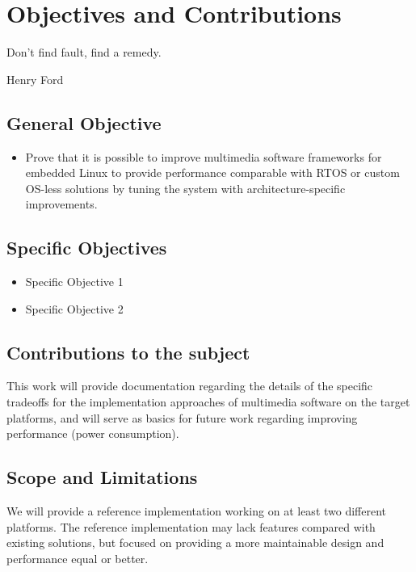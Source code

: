 \chapter{Objectives and Contributions}
\epigraph{Don't find fault, find a remedy.}{Henry Ford}

\section{General Objective}

\begin{itemize}
\item Prove that it is possible to improve multimedia software frameworks for embedded Linux to provide performance comparable with \ac{RTOS} or custom \ac{OS}-less solutions by tuning the system with architecture-specific improvements.
\end{itemize}

\section{Specific Objectives}
\begin{itemize}
\item Specific Objective 1
\item Specific Objective 2
\end{itemize}

\section{Contributions to the subject}
This work will provide documentation regarding the details of the specific tradeoffs for the implementation approaches of multimedia software on the target platforms, and will serve as basics for future work regarding improving performance (power consumption).

\section{Scope and Limitations}

We will provide a reference implementation working on at least two different platforms. The reference implementation may lack features compared with existing solutions, but focused on providing a more maintainable design and performance equal or better.
 